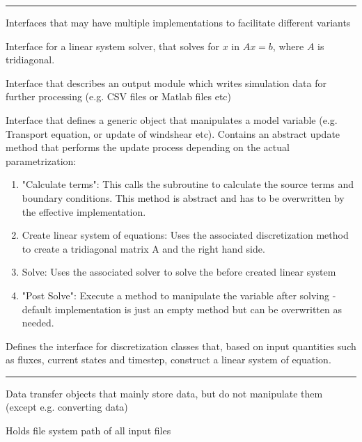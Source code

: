 \documentclass[paper=a4, fontsize=12pt]{article}
\begin{document}
\begin{description}[style=nextline]
	\vspace{1em}
	\hrule
	\item[Interfaces] \noindent Interfaces that may have multiple implementations to facilitate different variants
	
\begin{description}[style=multiline, leftmargin=17em]
		\item[LinSysSolver] Interface for a linear system solver, that solves for $x$ in $Ax=b$, where $A$ is tridiagonal.
		
		\item[SimstratOutputLogger] Interface that describes an output module which writes simulation data for further processing (e.g. CSV files or Matlab files etc)
		
		\item[ModelVariable] Interface that defines a generic object that manipulates a model variable (e.g. Transport equation, or update of windshear etc). Contains an abstract update method that performs the update process depending on the actual parametrization:
			\begin{enumerate}
				\item "Calculate terms": This calls the subroutine to calculate the source terms and boundary conditions. This method is abstract and has to be overwritten by the effective implementation.
				\item Create linear system of equations: Uses the associated discretization method to create a tridiagonal matrix A and the right hand side.
				\item Solve: Uses the associated solver to solve the before created linear system
				\item "Post Solve": Execute a method to manipulate the variable after solving - default implementation is just an empty method but can be overwritten as needed.
			
			\end{enumerate}


	\item[Discretization] Defines the interface for discretization classes that, based on input quantities such as fluxes, current states and timestep, construct a linear system of equation.
\end{description}
 \hrule
 
 	\item[DTOs] \noindent Data transfer objects that mainly store data, but do not manipulate them (except e.g. converting data)
 \begin{description}[style=multiline, leftmargin=17em]
		\item[InputConfig] Holds file system path of all input files
		

\end{description}
\end{description}
\end{document}
